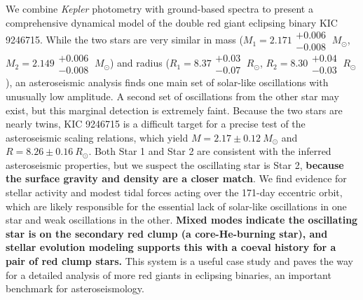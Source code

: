 We combine \emph{Kepler} photometry with ground-based spectra to present a comprehensive dynamical model of the double red giant eclipsing binary KIC 9246715. While the two stars are very similar in mass ($M_1 = 2.171\substack{+0.006 \\ -0.008} \ M_{\odot}$, $M_2 = 2.149\substack{+0.006 \\ -0.008} \ M_{\odot}$) and radius ($R_1 = 8.37\substack{+0.03 \\ -0.07} \ R_{\odot}$, $R_2 = 8.30\substack{+0.04 \\ -0.03} \ R_{\odot}$), an asteroseismic analysis finds one main set of solar-like oscillations with unusually low amplitude. A second set of oscillations from the other star may exist, but this marginal detection is extremely faint. Because the two stars are nearly twins, KIC 9246715 is a difficult target for a precise test of the asteroseismic scaling relations, which yield $M = 2.17\pm0.12 \ M_{\odot}$ and $R = 8.26\pm0.16 \ R_{\odot}$. Both Star 1 and Star 2 are consistent with the inferred asteroseismic properties, but we suspect the oscillating star is Star 2, \textbf{because the surface gravity and density are a closer match}. We find evidence for stellar activity and modest tidal forces acting over the 171-day eccentric orbit, which are likely responsible for the essential lack of solar-like oscillations in one star and weak oscillations in the other. \textbf{Mixed modes indicate the oscillating star is on the secondary red clump (a core-He-burning star), and stellar evolution modeling supports this with a coeval history for a pair of red clump stars.} This system is a useful case study and paves the way for a detailed analysis of more red giants in eclipsing binaries, an important benchmark for asteroseismology.
  
  
  
  
  